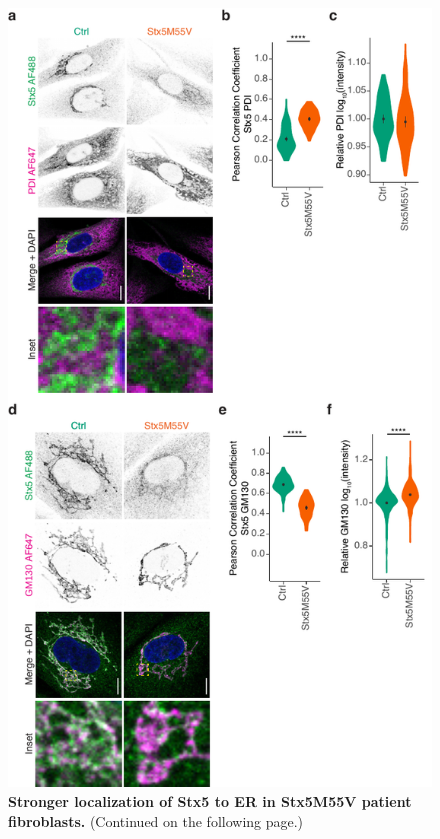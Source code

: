 \begin{figure}
    \includegraphics[keepaspectratio=true,width=\textwidth,height=\textheight]{chapters/chapter6/chapter6_SupplementaryFigure12.pdf}
    \caption{\textbf{Stronger localization of Stx5 to ER in Stx5M55V patient fibroblasts.} (Continued on the following page.)}
    \label{fig:ch6supfig12}
\end{figure}
